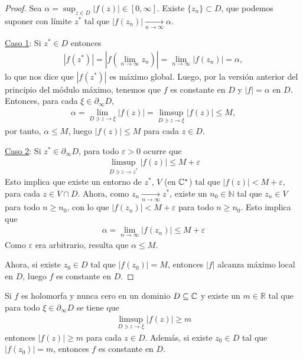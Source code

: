 \begin{proof}
    Sea $\alpha = \sup_{z \in D} |f(z)| \in [0,\infty]$. Existe $\{z_n\} \subset D$, que podemos suponer con límite $z^*$ tal que $|f(z_n)| \xrightarrow[n \to \infty]{} \alpha$.

    \underline{Caso 1}: Si $z^* \in D$ entonces
    \begin{align*}
        |f(z^*)| = \left| f\left( \lim_{n \to \infty}{z_n}\right) \right| = \lim_{n \to \infty} |f(z_n)| = \alpha,
    \end{align*}
    lo que nos dice que $|f(z^*)|$ es máximo global. Luego, por la versión anterior del principio del módulo máximo, tenemos que $f$ es constante en $D$ y $|f| = \alpha$ en $D$. Entonces, para cada $\xi \in \partial_{\infty} D$,
    \begin{align*}
        \alpha = \lim_{D \ni z \to \xi} |f(z)| = \limsup_{D \ni z \to \xi} |f(z)| \leq M,
    \end{align*}
    por tanto, $\alpha \leq M$, luego $|f(z)| \leq M$ para cada $z\in D$.

    \underline{Caso 2}: Si $z^* \in \partial_{\infty} D$, para todo $\varepsilon > 0$ ocurre que
    \begin{align*}
        \limsup_{D \ni z \to z^*}|f(z)| \leq M + \varepsilon
    \end{align*}
    Esto implica que existe un entorno de $z^*$, $V$ (en $\mathbb{C}^*$) tal que $|f(z)| < M + \varepsilon$, para cada $z \in V \cap D$. Ahora, como $z_n \xrightarrow[n \to \infty]{} z^*$, existe un $n_0 \in \mathbb{N}$ tal que $z_n \in V$ para todo $n \ge n_0$, con lo que $|f(z_n)| < M + \varepsilon$ para todo $n \ge n_0$. Esto implica que
    \begin{align*}
        \alpha = \lim_{n \to \infty} |f(z_n)| \leq M + \varepsilon
    \end{align*}
    Como $\varepsilon$ era arbitrario, resulta que $\alpha \leq M$.

    Ahora, si existe $z_0 \in D$ tal que $|f(z_0)| = M$, entonces $|f|$ alcanza máximo local en $D$, luego $f$ es constante en $D$.
\end{proof}

\begin{teo}
    Si $f$ es holomorfa y nunca cero en un dominio $D \subseteq \mathbb{C}$ y existe un $m \in \mathbb{R}$ tal que para todo $\xi \in \partial_{\infty} D$ se tiene que
    \begin{align*}
        \limsup_{D \ni z \to \xi} |f(z)| \ge m
    \end{align*}
    entonces $|f(z)| \ge m$ para cada $z \in D$. Además, si existe $z_0 \in D$ tal que $|f(z_0)| = m$, entonces $f$ es constante en $D$.
\end{teo}

